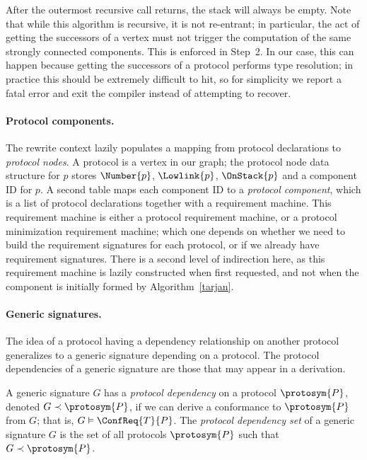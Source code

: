 \documentclass[../generics]{subfiles}
\begin{document}
After the outermost recursive call returns, the stack will always be empty. Note that while this algorithm is recursive, it is not re-entrant; in particular, the act of getting the successors of a vertex must not trigger the computation of the same strongly connected components. This is enforced in Step~2. In our case, this can happen because getting the successors of a protocol performs type resolution; in practice this should be extremely difficult to hit, so for simplicity we report a fatal error and exit the compiler instead of attempting to recover.

\paragraph{Protocol components.} The rewrite context lazily populates a mapping from protocol declarations to \emph{protocol nodes}. A protocol is a vertex in our graph; the protocol node data structure for $p$ stores $\Number{p}$, $\Lowlink{p}$, $\OnStack{p}$ and a component ID for $p$. A second table maps each component ID to a \emph{protocol component}, which is a list of protocol declarations together with a requirement machine. This requirement machine is either a protocol requirement machine, or a protocol minimization requirement machine; which one depends on whether we need to build the requirement signatures for each protocol, or if we already have requirement signatures. There is a second level of indirection here, as this requirement machine is lazily constructed when first requested, and not when the component is initially formed by Algorithm~\ref{tarjan}.

\paragraph{Generic signatures.}
The idea of a protocol having a dependency relationship on another protocol generalizes to a generic signature depending on a protocol. The protocol dependencies of a generic signature are those that may appear in a derivation.

\begin{definition}
A generic signature $G$ has a \emph{protocol dependency} on a protocol $\protosym{P}$, denoted \index{$\prec$}$G\prec\protosym{P}$, if we can derive a conformance to $\protosym{P}$ from $G$; that is, $G\vDash\ConfReq{T}{P}$. The \emph{protocol dependency set} of a generic signature $G$ is the set of all protocols $\protosym{P}$ such that $G\prec\protosym{P}$.

\end{definition}
\end{document}
